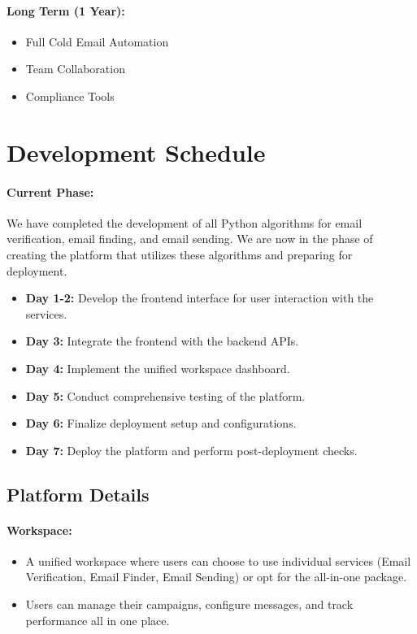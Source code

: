 \documentclass{article}
\begin{document}
\paragraph{Long Term (1 Year):}
\begin{itemize}
    \item Full Cold Email Automation
    \item Team Collaboration
    \item Compliance Tools
\end{itemize}

\section{Development Schedule}
\paragraph{Current Phase:} We have completed the development of all Python algorithms for email verification, email finding, and email sending. We are now in the phase of creating the platform that utilizes these algorithms and preparing for deployment.
\begin{itemize}
    \item \textbf{Day 1-2:} Develop the frontend interface for user interaction with the services.
    \item \textbf{Day 3:} Integrate the frontend with the backend APIs.
    \item \textbf{Day 4:} Implement the unified workspace dashboard.
    \item \textbf{Day 5:} Conduct comprehensive testing of the platform.
    \item \textbf{Day 6:} Finalize deployment setup and configurations.
    \item \textbf{Day 7:} Deploy the platform and perform post-deployment checks.
\end{itemize}

\subsection{Platform Details}
\paragraph{Workspace:}
\begin{itemize}
    \item A unified workspace where users can choose to use individual services (Email Verification, Email Finder, Email Sending) or opt for the all-in-one package.
    \item Users can manage their campaigns, configure messages, and track performance all in one place.
\end{itemize}
\end{document}
